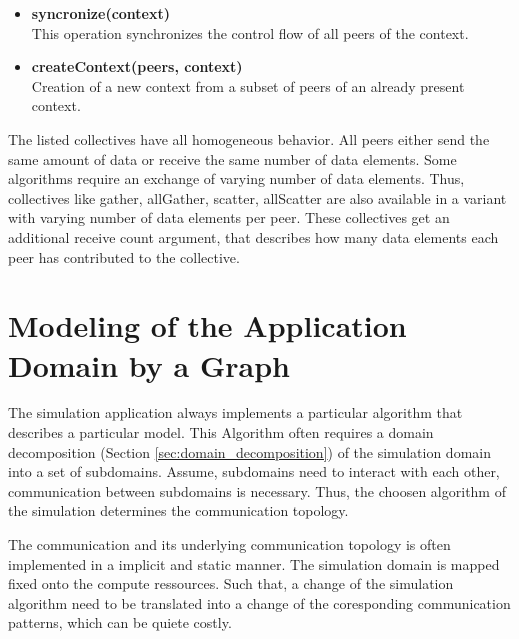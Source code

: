 \begin{itemize}
\item  \textbf{syncronize(context)}\\
  This operation synchronizes the control flow of all peers of the
  context.

\item  \textbf{createContext(peers, context)}\\ 
  Creation of a new context from a subset of peers of an already
  present context.

\end{itemize}

The listed collectives have all homogeneous behavior. All peers either
send the same amount of data or receive the same number of data elements.
Some algorithms require an  exchange of varying number of data elements. Thus,
collectives like gather, allGather, scatter, allScatter are also available
in a variant with varying number of data elements per peer. These collectives
get an additional receive count argument, that describes how many data elements
each peer has contributed to the collective.


\section{Modeling of the Application Domain by a Graph}
\label{sec:graph}
The simulation application always implements a particular algorithm
that describes a particular model. This Algorithm often requires a
domain decomposition (Section \ref{sec:domain_decomposition}) of the
simulation domain into a set of subdomains. Assume, subdomains need
to interact with each other, communication between subdomains is
necessary. Thus, the choosen algorithm of the simulation determines
the communication topology.

The communication and its underlying communication topology is often
implemented in a implicit and static manner. The simulation domain is
mapped fixed onto the compute ressources.  Such that, a change of the
simulation algorithm need to be translated into a change of the
coresponding communication patterns, which can be quiete costly.

